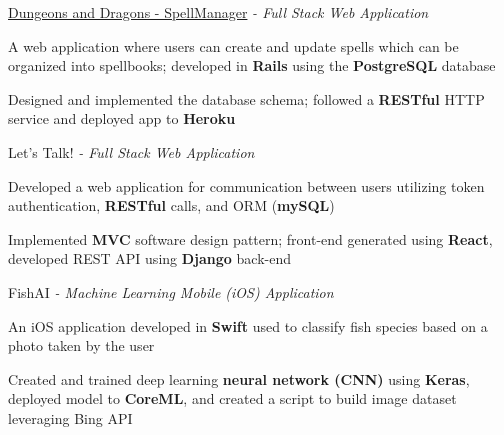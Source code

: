 \begin{siderulesProj}
\par\addvspace{-1.2ex}
\begin{cventriesproject}
  \cventryproject
  {\href{https://spellmanager-ah2lai.herokuapp.com/}{Dungeons and Dragons - SpellManager} \hspace{0.15em}\bodyfontlight\itshape{- Full Stack Web Application}}
  {
    \begin{cvskillitems}
      \item {A web application where users can create and update spells which can be organized into spellbooks; developed in \textbf{Rails} using the \textbf{PostgreSQL} database  }
      \item {Designed and implemented the database schema; followed a \textbf{RESTful} HTTP service and deployed app to \textbf{Heroku}}
    \end{cvskillitems}
  }
  \cventryproject
    {Let's Talk!  \hspace{0.15em}\bodyfontlight\itshape{- Full Stack Web Application}}
    {
      \begin{cvskillitems}
        \item {Developed a web application for communication between users utilizing token authentication, \textbf{RESTful} calls, and ORM (\textbf{mySQL})}
        \item {Implemented \textbf{MVC} software design pattern; front-end generated using \textbf{React}, developed REST API using \textbf{Django} back-end}
      \end{cvskillitems}
    }
  \cventryproject
    {FishAI  \hspace{0.15em}\bodyfontlight\itshape{- Machine Learning Mobile (iOS) Application}}
    {
      \begin{cvskillitems}
        \item {An iOS application developed in \textbf{Swift} used to classify fish species based on a photo taken by the user}
        \item {Created and trained deep learning \textbf{neural network (CNN)} using \textbf{Keras}, deployed model to \textbf{CoreML}, and created a script to build image dataset leveraging Bing API}
      \end{cvskillitems}
    }
\end{cventriesproject}
\end{siderulesProj}
